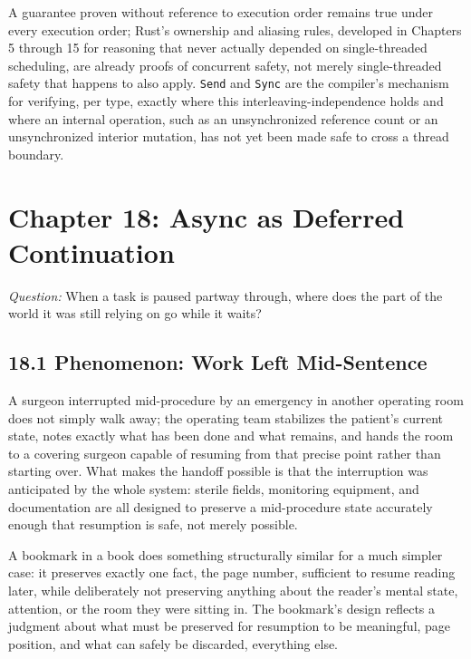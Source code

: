 \documentclass[11pt]{book}
\begin{document}
\begin{invariantbox}
A guarantee proven without reference to execution order remains true under every execution order; Rust's ownership and aliasing rules, developed in Chapters 5 through 15 for reasoning that never actually depended on single-threaded scheduling, are already proofs of concurrent safety, not merely single-threaded safety that happens to also apply. \texttt{Send} and \texttt{Sync} are the compiler's mechanism for verifying, per type, exactly where this interleaving-independence holds and where an internal operation, such as an unsynchronized reference count or an unsynchronized interior mutation, has not yet been made safe to cross a thread boundary.
\end{invariantbox}

\clearpage

\chapter*{Chapter 18: Async as Deferred Continuation}

\begin{firstprinciples}
\textit{Question:} When a task is paused partway through, where does the part of the world it was still relying on go while it waits?
\end{firstprinciples}

\section*{18.1 Phenomenon: Work Left Mid-Sentence}

A surgeon interrupted mid-procedure by an emergency in another operating room does not simply walk away; the operating team stabilizes the patient's current state, notes exactly what has been done and what remains, and hands the room to a covering surgeon capable of resuming from that precise point rather than starting over. What makes the handoff possible is that the interruption was anticipated by the whole system: sterile fields, monitoring equipment, and documentation are all designed to preserve a mid-procedure state accurately enough that resumption is safe, not merely possible.

A bookmark in a book does something structurally similar for a much simpler case: it preserves exactly one fact, the page number, sufficient to resume reading later, while deliberately not preserving anything about the reader's mental state, attention, or the room they were sitting in. The bookmark's design reflects a judgment about what must be preserved for resumption to be meaningful, page position, and what can safely be discarded, everything else.
\end{document}
